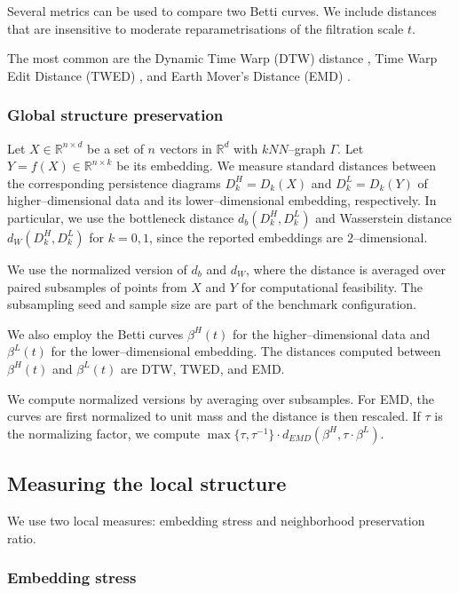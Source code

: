 \documentclass[11pt]{article}
\begin{document}
Several metrics can be used to compare two Betti curves. We include distances that are insensitive to moderate reparametrisations of the filtration scale $t$.

The most common are the Dynamic Time Warp (DTW) distance \cite{salvador-fastdtw, fastdtw-docs}, Time Warp Edit Distance (TWED) \cite{marteau-twed, pytwed-docs}, and Earth Mover's Distance (EMD) \cite{flamary-pot, ot-docs}. 

\subsubsection{Global structure preservation}

Let $X \in \mathbb{R}^{n\times d}$ be a set of $n$ vectors in $\mathbb{R}^d$ with $kNN$--graph $\Gamma$. Let $Y = f(X) \in \mathbb{R}^{n\times k}$ be its embedding. We measure standard distances between the corresponding persistence diagrams $D^H_k = D_k(X)$ and $D^L_k = D_k(Y)$ of higher--dimensional data and its lower--dimensional embedding, respectively. In particular, we use the bottleneck distance $d_b(D^H_k, D^L_k)$ and Wasserstein distance $d_W(D^H_k, D^L_k)$ for $k=0, 1$, since the reported embeddings are $2$--dimensional.

We use the normalized version of $d_b$ and $d_W$, where the distance is averaged over paired subsamples of points from $X$ and $Y$ for computational feasibility. The subsampling seed and sample size are part of the benchmark configuration.

We also employ the Betti curves $\beta^H(t)$ for the higher--dimensional data and $\beta^L(t)$ for the lower--dimensional embedding. The distances computed between $\beta^H(t)$ and $\beta^L(t)$ are DTW, TWED, and EMD.

We compute normalized versions by averaging over subsamples. For EMD, the curves are first normalized to unit mass and the distance is then rescaled. If $\tau$ is the normalizing factor, we compute $\max\{\tau, \tau^{-1}\} \cdot d_{EMD}(\beta^H, \tau\cdot\beta^L)$.

\subsection{Measuring the local structure}

We use two local measures: embedding stress and neighborhood preservation ratio. 

\subsubsection{Embedding stress}
\end{document}
